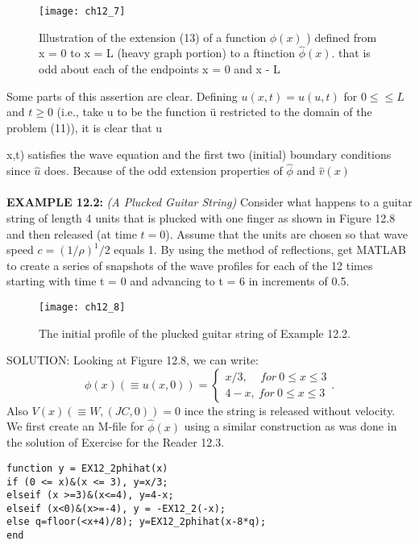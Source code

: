 \documentclass[../main.tex]{subfiles}
\begin{document}
\begin{figure}[H]
	\centering
	\texttt{[image: ch12\_7]}
	\caption{\textsf{  Illustration of the extension (13) of a function $\phi(x)$ ) defined from x = 0 to x
= L (heavy graph portion) to a ftinction $\hat{\phi}(x)$. that is odd about each of the endpoints x = 0
and x - L }}
	\label{pfig:ch12_7}
\end{figure}
Some parts of this assertion are clear. Defining $u(x,t) = \hat{u} (u,t)$ for $ 0\leqslant \leqslant L$ and $ t\geq 0$  (i.e., take u to be the function ü restricted to the domain of the 
problem (11)), it is clear that u{x,t) satisfies the wave equation and the first two 
(initial) boundary conditions since $\hat{u}$ does. Because of the odd extension 
properties of $\hat{\phi}$ and $ \hat{v} (x)$ 
\\
\\
\textbf{EXAMPLE 12.2:} \textit{(A Plucked Guitar String)} 
Consider what happens to a guitar string of length 4 units that is plucked with one finger as shown in Figure 12.8 and then released (at time  $t = 0$). Assume that the units are chosen so that wave speed $ c=(1/ \rho )^1/2 $ equals 1. By using the method of reflections, get MATLAB to create a series of snapshots of the wave profiles for each of the 12 times starting with time t = 0 and advancing to t = 6 in increments of 0.5. 
\begin{figure}[H]
	\centering
	\texttt{[image: ch12\_8]}
	\caption{\textsf{ The initial profile of the plucked guitar string of Example 12.2.}}
	\label{pfig:ch12_8}
\end{figure}
SOLUTION: Looking at Figure 12.8, we can write: 
\begin{equation}
\phi(x) (\equiv u(x,0)) =
\begin{cases}
x/3, ~~~~~for~ 0 \leqslant x \leqslant 3 \\
4 - x, ~for~ 0\leqslant x \leqslant 3 
\end{cases} .
\end{equation}
Also $V(x)(\equiv W,(JC,0)) = 0$ ince the string is released without velocity. We first 
create an M-file for $ \hat{\phi}(x)$ using a similar construction as was done in the solution 
of Exercise for the Reader 12.3. 
\begin{verbatim}
function y = EX12_2phihat(x) 
if (0 <= x)&(x <= 3), y=x/3; 
elseif (x >=3)&(x<=4), y=4-x; 
elseif (x<0)&(x>=-4), y = -EX12_2(-x); 
else q=floor(<x+4)/8); y=EX12_2phihat(x-8*q); 
end 
\end{verbatim}
}
\end{document}
